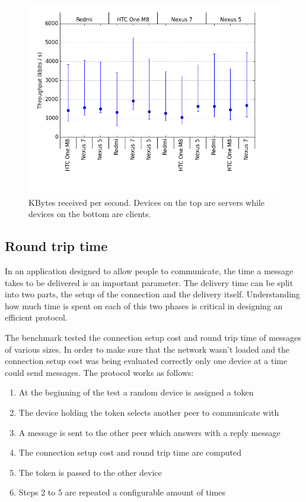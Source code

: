 \begin{figure}[ht!]
  \centering
  \includegraphics[width=1.0\textwidth]{img/throughput.png} 
  \caption{KBytes received per second. Devices on the top are servers while devices on the bottom are clients.}
  \label{figure:throughput}
\end{figure}

\subsection{Round trip time}
In an application designed to allow people to communicate, the time a message takes to be delivered is an important parameter.
The delivery time can be split into two parts, the setup of the connection and the delivery itself.
Understanding how much time is spent on each of this two phases is critical in designing an efficient protocol.

The benchmark tested the connection setup cost and round trip time of messages of various sizes.
In order to make sure that the network wasn't loaded and the connection setup cost was being evaluated correctly only one device at a time could send messages.
The protocol works as follows:

\begin{enumerate}
\item At the beginning of the test a random device is assigned a token
\item The device holding the token selects another peer to communicate with
\item A message is sent to the other peer which answers with a reply message
\item The connection setup cost and round trip time are computed
\item The token is passed to the other device
\item Steps 2 to 5 are repeated a configurable amount of times
\end{enumerate}


